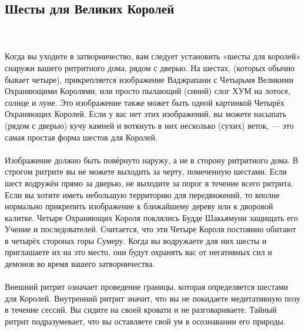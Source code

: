 \subsection{Шесты для Великих Королей}
\\ \\ Когда вы уходите в затворничество, вам следует установить «шесты для королей» снаружи вашего ритритного дома, рядом с дверью. На шестах, (которых обычно бывает четыре), прикрепляется изображение Ваджрапани с Четырьмя Великими Охраняющими Королями, или просто пылающий (синий) слог ХУМ на лотосе, солнце и луне. Это изображение также может быть одной картинкой Четырёх Охраняющих Королей. Если у вас нет этих изображений, вы можете насыпать (рядом с дверью) кучу камней и воткнуть в них несколько (сухих) веток, — это самая простая форма шестов для Королей.
\\ \\ Изображение должно быть повёрнуто наружу, а не в сторону ритритного дома. В строгом ритрите вы не можете выходить за черту, помеченную шестами. Если шест водружён прямо за дверью, не выходите за порог в течение всего ритрита. Если вы хотите иметь небольшую территорию для передвижений, то вполне нормально прикрепить изображение к ближайшему дереву или к дворовой калитке. Четыре Охраняющих Короля поклялись Будде Шакьямуни защищать его Учение и последователей. Считается, что эти Четыре Короля постоянно обитают в четырёх сторонах горы Сумеру. Когда вы водружаете для них шесты и приглашаете их на это место, они будут охранять вас от негативных сил и демонов во время вашего затворничества.
\\ \\ Внешний ритрит означает проведение границы, которая определяется шестами для Королей. Внутренний ритрит значит, что вы не покидаете медитативную позу в течение сессий. Вы сидите на своей кровати и не разговариваете. Тайный ритрит подразумевает, что вы оставляете свой ум в осознавании его природы.
